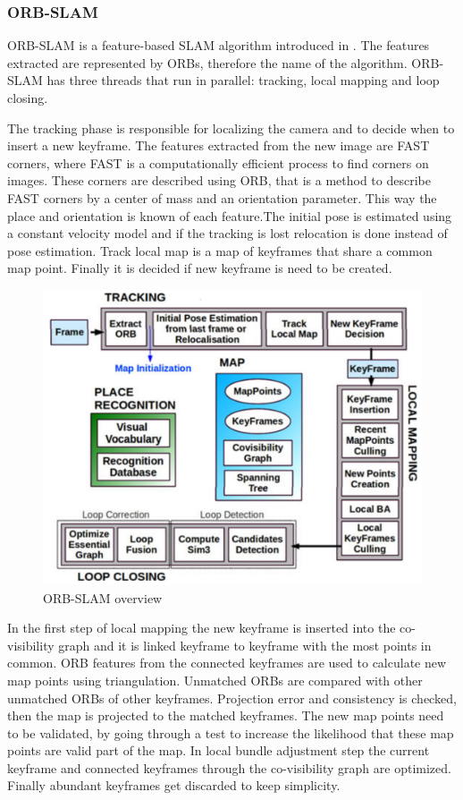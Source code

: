 \subsubsection{ORB-SLAM}
ORB-SLAM is a feature-based SLAM algorithm introduced in \cite{mur2015orb}. The features extracted are represented by ORBs,
therefore the name of the algorithm. ORB-SLAM has three threads that run in parallel: tracking, local mapping and 
loop closing.

The tracking phase is responsible for localizing the camera and to decide when to insert a new keyframe.
The features extracted from the new image are FAST corners, where FAST is a computationally efficient process to find corners
on images. These corners are described using ORB, that is a method to describe FAST corners by a center of mass and
an orientation parameter. This way the place and orientation is known of each feature.The initial pose is estimated using 
a constant velocity model and if the tracking is lost relocation is done instead of pose estimation.
Track local map is a map of keyframes that share a common map point. Finally it is decided if new keyframe is need to be
created.


\begin{figure}[!hb]
    \centering
    \includegraphics[width=150mm, keepaspectratio]{figures/orb_slam_overview.png}
    \caption{ORB-SLAM overview \cite{mur2015orb}}
    \label{fig:orb_slam_overview}
\end{figure}


In the first step of local mapping the new keyframe is inserted into the co-visibility graph and it is linked keyframe to keyframe
with the most points in common. ORB features from the connected keyframes are used to calculate new map points using triangulation. 
Unmatched ORBs are compared with other unmatched ORBs of other keyframes. Projection error and consistency is checked, then the 
map is projected to the matched keyframes. The new map points need to be validated, by going through a test to increase the 
likelihood that these map points are valid part of the map. In local bundle adjustment step the current keyframe and connected
keyframes through the co-visibility graph are optimized. Finally abundant keyframes get discarded to keep simplicity.

